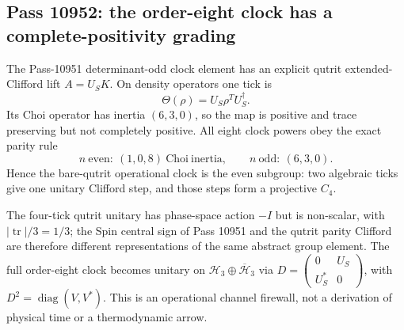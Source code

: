\subsection{Pass 10952: the order-eight clock has a complete-positivity grading}

The Pass-10951 determinant-odd clock element has an explicit qutrit
extended-Clifford lift $A=U_SK$.  On density operators one tick is
\[
 \Theta(\rho)=U_S\rho^T U_S^\dagger .
\]
Its Choi operator has inertia $(6,3,0)$, so the map is positive and
trace preserving but not completely positive.  All eight clock powers obey
the exact parity rule
\[
 n\ \mathrm{even}:\ (1,0,8)\ \mathrm{Choi\ inertia},\qquad
 n\ \mathrm{odd}:\ (6,3,0).
\]
Hence the bare-qutrit operational clock is the even subgroup: two algebraic
ticks give one unitary Clifford step, and those steps form a projective $C_4$.

The four-tick qutrit unitary has phase-space action $-I$ but is non-scalar,
with $|\operatorname{tr}|/3=1/3$; the Spin central sign of Pass 10951 and
the qutrit parity Clifford are therefore different representations of the
same abstract group element.  The full order-eight clock becomes unitary on
$\mathcal H_3\oplus\overline{\mathcal H}_3$ via
$D=\left(\begin{smallmatrix}0&U_S\\U_S^*&0\end{smallmatrix}\right)$,
with $D^2=\operatorname{diag}(V,V^*)$.  This is an operational channel
firewall, not a derivation of physical time or a thermodynamic arrow.
